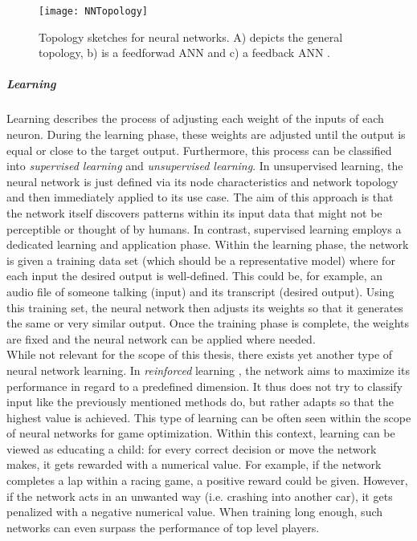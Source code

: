 \documentclass[draft,final]{vutinfth} %
\begin{document}
\begin{figure}
\begin{center}
\texttt{[image: NNTopology]}
\end{center}
\caption{Topology sketches for neural networks. A) depicts the general topology, b) is a feedforwad ANN and c) a feedback ANN \cite{zou2009overview}.}
\end{figure}

\subparagraph{Learning} Learning describes the process of adjusting each weight of the inputs of each neuron. During the learning phase, these weights are adjusted until the output is equal or close to the target output. Furthermore, this process can be classified into \emph{supervised learning} and \emph{unsupervised learning}. In unsupervised learning, the neural network is just defined via its node characteristics and network topology and then immediately applied to its use case. The aim of this approach is that the network itself discovers patterns within its input data that might not be perceptible or thought of by humans.
In contrast, supervised learning employs a dedicated learning and application phase. Within the learning phase, the network is given a training data set (which should be a representative model) where for each input the desired output is well-defined. This could be, for example, an audio file of someone talking (input) and its transcript (desired output). Using this training set, the neural network then adjusts its weights  so that it generates the same  or very similar output. 
Once the training phase is complete, the weights are fixed and the neural network can be applied where needed.  \\
While not relevant for the scope of this thesis, there exists yet another type of neural network learning. In \emph{reinforced} learning \cite{mahesh2020machine}, the network aims to maximize its performance in regard to a predefined dimension. It thus does not try to classify input like the previously mentioned methods do, but rather adapts so that the highest value is achieved. This type of learning can be often seen within the scope of neural networks for game optimization. Within this context, learning can be viewed as educating a child: for every correct decision or move the network makes, it gets rewarded with a numerical value. For example, if the network completes a lap within a racing game, a positive reward could be given. However, if the network acts in an unwanted way (i.e. crashing into another car), it gets penalized with a negative numerical value. When training long enough, such networks can even surpass the performance of top level players.
\end{document}
